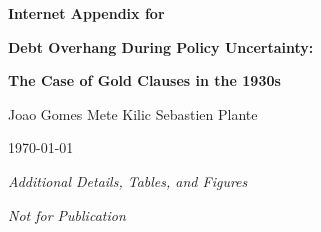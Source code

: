 \clearpage
\makeatletter
\let\Hy@WarnOptionDisabled\@gobble
\makeatother
\hypersetup{pageanchor=false}

\centerline{\large{\bf  {Internet Appendix for}}} 
\centerline{\large{\bf  {Debt Overhang During Policy Uncertainty:}}}
\centerline{\large{\bf  {The Case of Gold Clauses in the 1930s}}} 
\vspace{1cm}

\centerline{\large  Joao Gomes \hspace{1cm} Mete Kilic \hspace{1cm} Sebastien Plante}

\vspace*{3cm}

\begin{center}
\large \today
\end{center}

\vspace*{3cm}

\centerline{\large{\it  {Additional Details, Tables, and Figures} }}
\centerline{\large{\it  {Not for Publication} }}

\setcounter{table}{0}
\setcounter{figure}{0}
\setcounter{section}{0}

\renewcommand{\thetable}{IA.\arabic{table}}
\renewcommand{\thefigure}{IA.\arabic{figure}}

\pagestyle{fancy}
\fancyhf{}

\renewcommand{\headrulewidth}{0pt}

\makeatletter
{}
\makeatother
\setcounter{page}{1}
\renewcommand{\thesection}{IA.\arabic{section}}

\vspace{2cm}


